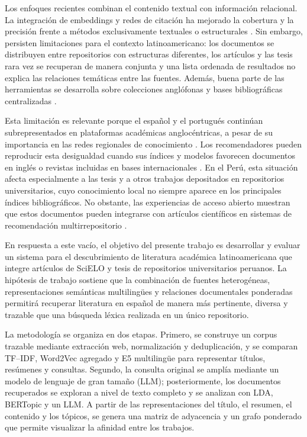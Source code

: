 \documentclass[conference]{IEEEtran}
\begin{document}
Los enfoques recientes combinan el contenido textual con información relacional. La integración de embeddings y redes de citación ha mejorado la cobertura y la precisión frente a métodos exclusivamente textuales o estructurales \cite{liu2025llm}. Sin embargo, persisten limitaciones para el contexto latinoamericano: los documentos se distribuyen entre repositorios con estructuras diferentes, los artículos y las tesis rara vez se recuperan de manera conjunta y una lista ordenada de resultados no explica las relaciones temáticas entre las fuentes. Además, buena parte de las herramientas se desarrolla sobre colecciones anglófonas y bases bibliográficas centralizadas \cite{b1}.

Esta limitación es relevante porque el español y el portugués continúan subrepresentados en plataformas académicas anglocéntricas, a pesar de su importancia en las redes regionales de conocimiento \cite{pradier2026}. Los recomendadores pueden reproducir esta desigualdad cuando sus índices y modelos favorecen documentos en inglés o revistas incluidas en bases internacionales \cite{farber2023biases}. En el Perú, esta situación afecta especialmente a las tesis y a otros trabajos depositados en repositorios universitarios, cuyo conocimiento local no siempre aparece en los principales índices bibliográficos. No obstante, las experiencias de acceso abierto muestran que estos documentos pueden integrarse con artículos científicos en sistemas de recomendación multirrepositorio \cite{Borovic2020}.

En respuesta a este vacío, el objetivo del presente trabajo es desarrollar y evaluar un sistema para el descubrimiento de literatura académica latinoamericana que integre artículos de SciELO y tesis de repositorios universitarios peruanos. La hipótesis de trabajo sostiene que la combinación de fuentes heterogéneas, representaciones semánticas multilingües y relaciones documentales ponderadas permitirá recuperar literatura en español de manera más pertinente, diversa y trazable que una búsqueda léxica realizada en un único repositorio.

La metodología se organiza en dos etapas. Primero, se construye un corpus trazable mediante extracción web, normalización y deduplicación, y se comparan TF--IDF, Word2Vec agregado y E5 multilingüe para representar títulos, resúmenes y consultas. Segundo, la consulta original se amplía mediante un modelo de lenguaje de gran tamaño (LLM); posteriormente, los documentos recuperados se exploran a nivel de texto completo y se analizan con LDA, BERTopic y un LLM. A partir de las representaciones del título, el resumen, el contenido y los tópicos, se genera una matriz de adyacencia y un grafo ponderado que permite visualizar la afinidad entre los trabajos.
\end{document}
